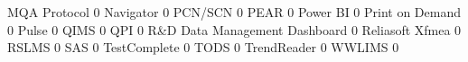 \documentclass{article}
\begin{document}
\begin{Schunk}
\begin{Soutput}
  MQA Protocol                                                                   0
  Navigator                                                                      0
  PCN/SCN                                                                        0
  PEAR                                                                           0
  Power BI                                                                       0
  Print on Demand                                                                0
  Pulse                                                                          0
  QIMS                                                                           0
  QPI                                                                            0
  R&D Data Management Dashboard                                                  0
  Reliasoft Xfmea                                                                0
  RSLMS                                                                          0
  SAS                                                                            0
  TestComplete                                                                   0
  TODS                                                                           0
  TrendReader                                                                    0
  WWLIMS                                                                         0
                                                           

\end{Soutput}
\end{Schunk}
\end{document}

